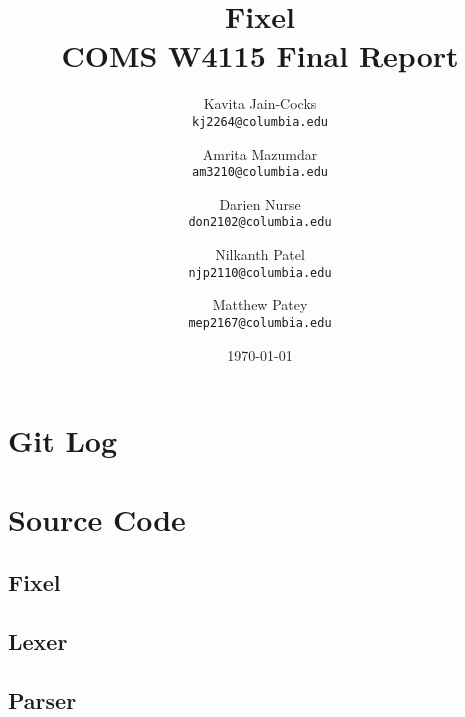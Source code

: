 \documentclass{article}
\title{Fixel \\
COMS W4115 Final Report}
\author{
  Kavita Jain-Cocks\\
  \texttt{kj2264@columbia.edu}
  \and
  Amrita Mazumdar\\
  \texttt{am3210@columbia.edu}
  \and
  Darien Nurse\\
  \texttt{don2102@columbia.edu}
  \and
  Nilkanth Patel\\
  \texttt{njp2110@columbia.edu}
  \and
  Matthew Patey\\
  \texttt{mep2167@columbia.edu}
   \\}
\date{\today}
\begin{document}
\maketitle
\newpage
\tableofcontents
\newpage






\newpage
\appendix
\section{Git Log}
\section{Source Code}
    \subsection{Fixel}
         
    \subsection{Lexer}
         
    \subsection{Parser}
        
\end{document}
